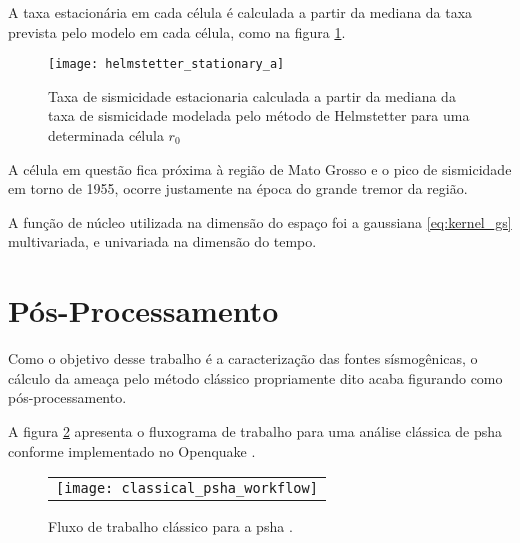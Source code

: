 A taxa estacionária em cada célula é calculada a partir da mediana da taxa prevista pelo modelo em cada célula,
como na figura \ref{fig:h_stationary}.
\begin{figure}[H]
  \centering
  \texttt{[image: helmstetter\_stationary\_a]} 
  \caption{Taxa de sismicidade estacionaria calculada a partir da mediana da taxa de sismicidade
  modelada pelo método de Helmstetter para uma determinada célula $r_0$}
  \label{fig:h_stationary} 
\end{figure}
A célula em questão fica próxima à região de Mato Grosso e o pico de sismicidade em torno de 1955,
ocorre justamente na época do grande tremor da região.

A função de núcleo utilizada na dimensão do espaço foi a gaussiana \eqref{eq:kernel_gs} multivariada, 
e univariada na dimensão do tempo.

\section{Pós-Processamento}
\label{sec:pos_proc}

Como o objetivo desse trabalho é a caracterização das fontes sísmogênicas,
o cálculo da ameaça pelo método clássico propriamente dito
acaba figurando como pós-processamento.

A figura \ref{fig:classical_psha} apresenta o fluxograma de trabalho para uma análise clássica de \gls{psha} conforme
implementado no Openquake \citep{pagani_2010, weatherill_2012}.

\begin{figure}[H]
	\centering
	\begin{tabular}{l}
	\texttt{[image: classical\_psha\_workflow]}
	\end{tabular}
	\caption{Fluxo de trabalho clássico para a \gls{psha} \citep{crowley_2013}.}
\label{fig:classical_psha}
\end{figure}
